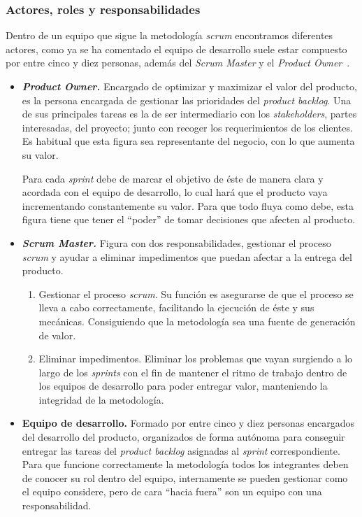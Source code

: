 \subsubsection{Actores, roles y responsabilidades}
Dentro de un equipo que sigue la metodología \textit{scrum} encontramos diferentes actores, como ya se ha comentado el equipo de desarrollo suele estar compuesto por entre cinco y diez personas, además del \textit{Scrum Master} y el \textit{Product Owner}~\cite{julioroche_2020}.
\begin{itemize}
\item \textbf{\textit{Product Owner.}} Encargado de optimizar y maximizar el valor del producto, es la persona encargada de gestionar las prioridades del \textit{product backlog}. Una de sus principales tareas es la de ser intermediario con los \textit{stakeholders}, partes interesadas, del proyecto; junto con recoger los requerimientos de los clientes. Es habitual que esta figura sea representante del negocio, con lo que aumenta su valor.

Para cada \textit{sprint} debe de marcar el objetivo de éste de manera clara y acordada con el equipo de desarrollo, lo cual hará que el producto vaya incrementando constantemente su valor. Para que todo fluya como debe, esta figura tiene que tener el ``poder'' de tomar decisiones que afecten al producto.

\item \textbf{\textit{Scrum Master.}} Figura con dos responsabilidades, gestionar el proceso \textit{scrum} y ayudar a eliminar impedimentos que puedan afectar a la entrega del producto.
\begin{enumerate}
\item Gestionar el proceso \textit{scrum}. Su función es asegurarse de que el proceso se lleva a cabo correctamente, facilitando la ejecución de éste y sus mecánicas. Consiguiendo que la metodología sea una fuente de generación de valor.
\item Eliminar impedimentos. Eliminar los problemas que vayan surgiendo a lo largo de los \textit{sprints} con el fin de mantener el ritmo de trabajo dentro de los equipos de desarrollo para poder entregar valor, manteniendo la integridad de la metodología.
\end{enumerate}
\item \textbf{Equipo de desarrollo.} Formado por entre cinco y diez personas encargados del desarrollo del producto, organizados de forma autónoma para conseguir entregar las tareas del \textit{product backlog} asignadas al \textit{sprint} correspondiente. Para que funcione correctamente la metodología todos los integrantes deben de conocer su rol dentro del equipo, internamente se pueden gestionar como el equipo considere, pero de cara ``hacia fuera'' son un equipo con una responsabilidad.
\end{itemize}
\newpage
